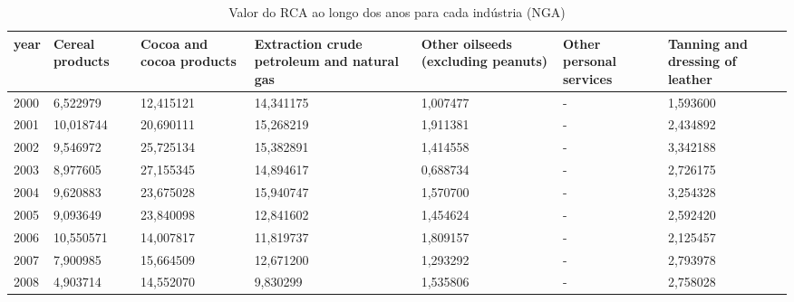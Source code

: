 \begin{table}
\centering
\caption{Valor do RCA ao longo dos anos para cada indústria (NGA)}
\begin{tabular}{p{1cm}p{2cm}p{2cm}p{2cm}p{2cm}p{2cm}p{2cm}}
\toprule
 year &  Cereal products &  Cocoa and cocoa products &  Extraction crude petroleum and natural gas &  Other oilseeds (excluding peanuts) &  Other personal services &  Tanning and dressing of leather \\
\midrule
 2000 &         6,522979 &                 12,415121 &                                   14,341175 &                            1,007477 &                        - &                         1,593600 \\
 2001 &        10,018744 &                 20,690111 &                                   15,268219 &                            1,911381 &                        - &                         2,434892 \\
 2002 &         9,546972 &                 25,725134 &                                   15,382891 &                            1,414558 &                        - &                         3,342188 \\
 2003 &         8,977605 &                 27,155345 &                                   14,894617 &                            0,688734 &                        - &                         2,726175 \\
 2004 &         9,620883 &                 23,675028 &                                   15,940747 &                            1,570700 &                        - &                         3,254328 \\
 2005 &         9,093649 &                 23,840098 &                                   12,841602 &                            1,454624 &                        - &                         2,592420 \\
 2006 &        10,550571 &                 14,007817 &                                   11,819737 &                            1,809157 &                        - &                         2,125457 \\
 2007 &         7,900985 &                 15,664509 &                                   12,671200 &                            1,293292 &                        - &                         2,793978 \\
 2008 &         4,903714 &                 14,552070 &                                    9,830299 &                            1,535806 &                        - &                         2,758028 \\

\end{tabular}
\end{table}
